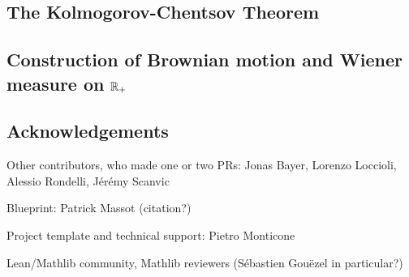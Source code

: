 \documentclass[lean]{DraftAFM}
\begin{document}
\subsection{The Kolmogorov-Chentsov Theorem}

\subsection{Construction of Brownian motion and Wiener measure on $\mathbb{R}_+$}



\subsection{Acknowledgements}

Other contributors, who made one or two PRs: Jonas Bayer, Lorenzo Loccioli, Alessio Rondelli, Jérémy Scanvic

Blueprint: Patrick Massot (citation?)

Project template \cite{Monticone_LeanProject_2025} and technical support: Pietro Monticone

Lean/Mathlib community, Mathlib reviewers (Sébastien Gouëzel in particular?)

\printbibliography
\end{document}
